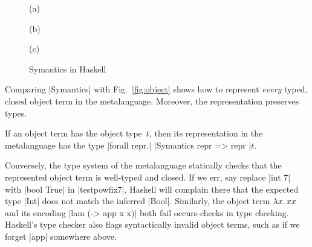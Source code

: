 \ifshort
\begin{figure}
(a) 

(b) 

(c) 
\caption{Symantics in Haskell}
\label{fig:symantics-haskell}
\end{figure}
\fi

Comparing |Symantics| with Fig.~\ref{fig:object}
shows how to represent \emph{every} typed, closed object term in the
metalanguage. Moreover, the representation preserves types.
\begin{proposition}
If an object term has the object type~$t$, then its
representation in the metalanguage has the type 
|forall repr.| |Symantics repr => repr |$t$.
\end{proposition}
Conversely, the type system of the metalanguage statically checks that the
represented object term is well-typed and closed.
If we err, say replace |int 7| with |bool True| in
|testpowfix7|, Haskell will complain there that the expected type |Int| does not
match the inferred |Bool|.  Similarly, the object term $\mathopen{\lambda\mathord{x}.\,}xx$ and its
encoding |lam (\x -> app x x)| both fail occurs-checks in type checking.
Haskell's type checker also flags syntactically invalid object terms, 
such as if we forget |app| somewhere above.


